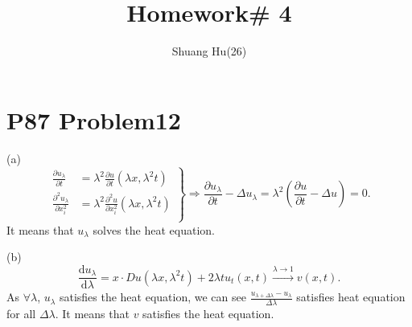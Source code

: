 \documentclass[a4paper]{ctexart}
\title{Homework\# 4}
\author{Shuang Hu(26)}
\newcommand{\dif}{\mathrm{d}}
\newcommand{\difFrac}[2]{\frac{\dif #1}{\dif #2}}
\newcommand{\pdfFrac}[2]{\frac{\partial #1}{\partial #2}}
\begin{document}
\maketitle
\section*{P87 Problem12}
(a)
\begin{equation}
    \left.
        \begin{aligned}
            \pdfFrac{u_{\lambda}}{t}&=\lambda^{2}\pdfFrac{u}{t}(\lambda x,\lambda^{2}t)\\
            \pdfFrac{^{2}u_{\lambda}}{x_{i}^{2}}&=\lambda^{2}\pdfFrac{^{2}u}{x_{i}^{2}}(\lambda x,\lambda^{2}t)\\
        \end{aligned}
    \right\}
    \Rightarrow \pdfFrac{u_{\lambda}}{t}-\Delta u_{\lambda}=\lambda^{2}(\pdfFrac{u}{t}-\Delta u)=0.
\end{equation}
It means that $u_{\lambda}$ solves the heat equation.

(b)
\begin{equation}
    \difFrac{u_{\lambda}}{\lambda}=x\cdot Du(\lambda x,\lambda^{2}t)+2\lambda tu_{t}(x,t)\stackrel{\lambda\rightarrow 1}{\longrightarrow}v(x,t).
\end{equation}
As $\forall\lambda$, $u_{\lambda}$ satisfies the heat equation, we can see 
$\frac{u_{\lambda+\Delta\lambda}-u_{\lambda}}{\Delta\lambda}$ satisfies heat equation for all $\Delta\lambda$. It means that $v$ satisfies the heat equation.
\end{document}
